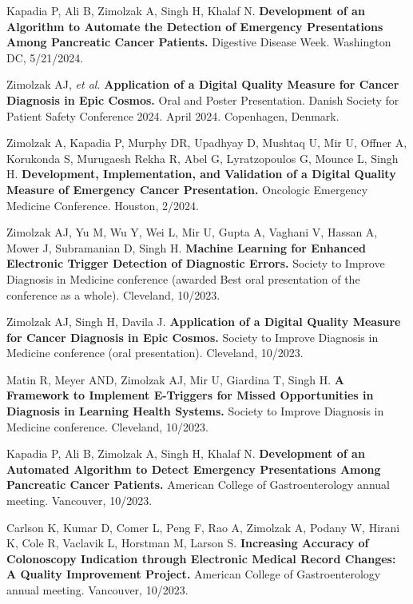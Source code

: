 \documentclass[10pt]{article}
\begin{document}
Kapadia P, Ali B, Zimolzak A, Singh H, Khalaf N. \textbf{Development
  of an Algorithm to Automate the Detection of Emergency Presentations
  Among Pancreatic Cancer Patients.} Digestive Disease Week.
Washington DC, 5/21/2024.

Zimolzak AJ, \emph{et al.} \textbf{Application of a Digital Quality
  Measure for Cancer Diagnosis in Epic Cosmos.} Oral and Poster
Presentation. Danish Society for Patient Safety Conference 2024. April
2024. Copenhagen, Denmark.

Zimolzak A, Kapadia P, Murphy DR, Upadhyay D, Mushtaq U, Mir U, Offner
A, Korukonda S, Murugaesh Rekha R, Abel G, Lyratzopoulos G, Mounce L,
Singh H. \textbf{Development, Implementation, and Validation of a
  Digital Quality Measure of Emergency Cancer Presentation.} Oncologic
Emergency Medicine Conference. Houston, 2/2024.


Zimolzak AJ, Yu M, Wu Y, Wei L, Mir U, Gupta A, Vaghani V, Hassan A,
Mower J, Subramanian D, Singh H. \textbf{Machine Learning for Enhanced
  Electronic Trigger Detection of Diagnostic Errors.} Society to
Improve Diagnosis in Medicine conference (awarded Best oral
presentation of the conference as a whole). Cleveland, 10/2023.

Zimolzak AJ, Singh H, Davila J. \textbf{Application of a Digital
  Quality Measure for Cancer Diagnosis in Epic Cosmos.} Society to
Improve Diagnosis in Medicine conference (oral presentation).
Cleveland, 10/2023.

Matin R, Meyer AND, Zimolzak AJ, Mir U, Giardina T, Singh H. \textbf{A
  Framework to Implement E-Triggers for Missed Opportunities in
  Diagnosis in Learning Health Systems.} Society to Improve Diagnosis
in Medicine conference. Cleveland, 10/2023.


Kapadia P, Ali B, Zimolzak A, Singh H, Khalaf N. \textbf{Development
  of an Automated Algorithm to Detect Emergency Presentations Among
  Pancreatic Cancer Patients.} American College of Gastroenterology
annual meeting. Vancouver, 10/2023.

Carlson K, Kumar D, Comer L, Peng F, Rao A, Zimolzak A, Podany W,
Hirani K, Cole R, Vaclavik L, Horstman M, Larson S. \textbf{Increasing
  Accuracy of Colonoscopy Indication through Electronic Medical Record
  Changes: A Quality Improvement Project.} American College of
Gastroenterology annual meeting. Vancouver, 10/2023.

\end{document}
